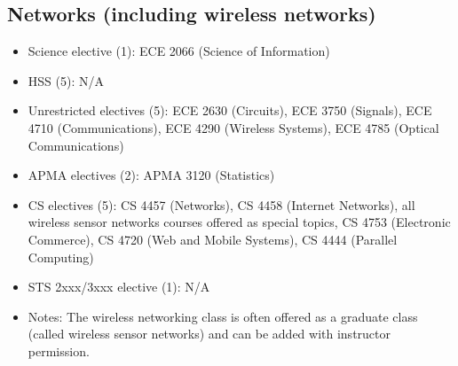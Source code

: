 \documentclass[10pt,letter]{book}
\newenvironment{itemlist}{
\begin{itemize}
\setlength{\itemsep}{0pt}
\setlength{\parskip}{0pt}}
{\end{itemize}}
\begin{document}
\subsection{Networks (including wireless networks)}
\begin{itemlist}
\item Science elective (1): ECE 2066 (Science of Information)
\item HSS (5): N/A
\item Unrestricted electives (5): ECE 2630 (Circuits), ECE 3750
  (Signals), ECE 4710 (Communications), ECE 4290 (Wireless Systems),
  ECE 4785 (Optical Communications)
\item APMA electives (2): APMA 3120 (Statistics)
\item CS electives (5): CS 4457 (Networks), CS 4458 (Internet
  Networks), all wireless sensor networks courses offered as special
  topics, CS 4753 (Electronic Commerce), CS 4720 (Web and Mobile
  Systems), CS 4444 (Parallel Computing)
\item STS 2xxx/3xxx elective (1): N/A
\item Notes: The wireless networking class is often offered as a graduate class (called wireless sensor networks) and can be added with instructor permission. 
\end{itemlist}
\end{document}
